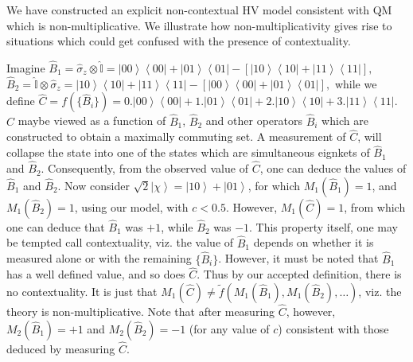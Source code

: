 \documentclass[british,aps,prl,superscriptaddress,nofootinbib,times,reprint]{revtex4-1}
\theoremstyle{plain}
\theoremstyle{plain}
\theoremstyle{definition}
\theoremstyle{remark}
\theoremstyle{remark}
\theoremstyle{remark}
\theoremstyle{plain}
\theoremstyle{plain}
\theoremstyle{plain}
\theoremstyle{definition}
\theoremstyle{definition}
\begin{document}
We have  constructed an explicit non-contextual HV
model consistent with QM which is
non-multiplicative. We illustrate how
non-multiplicativity gives rise to situations which
could get confused with the presence of contextuality.

Imagine
$
\hat{B}_{1}=\hat{\sigma}_{z}\otimes\hat{\mathbb{I}}=
\left|00\right\rangle
\left\langle 00\right|+\left|01\right\rangle
\left\langle 01\right|-\left[\left|10\right\rangle
\left\langle 10\right|+\left|11\right\rangle
\left\langle 11\right|\right],
$ 
$
\hat{B}_{2}=\hat{\mathbb{I}}\otimes\hat{\sigma}_{z}=
\left|10\right\rangle
\left\langle 10\right|+\left|11\right\rangle
\left\langle 11\right|-\left[\left|00\right\rangle
\left\langle 00\right|+\left|01\right\rangle
\left\langle 01\right|\right],
$ 
while we define 
$
\hat{C}=f(\{\hat{B}_{i}\})
=0.\left|00\right\rangle \left\langle
00\right|+1.\left|01\right\rangle \left\langle
01\right|+2.\left|10\right\rangle \left\langle
10\right|+3.\left|11\right\rangle \left\langle
11\right|. 
$
$\hat{C}$ maybe viewed as a function of
$\hat{B}_{1}$, $\hat{B}_{2}$ and other operators
$\hat{B}_{i}$ which are constructed to obtain a
maximally commuting set. A measurement of
$\hat{C}$, will collapse the state into one of the
states which are simultaneous eignkets of $\hat{B}_{1}$
and $\hat{B}_{2}$. Consequently, from the observed value
of $\hat{C}$, one can deduce the values of
$\hat{B}_{1}$ and $\hat{B}_{2}$. Now consider
$\sqrt{2}\left|\chi\right\rangle
=\left|10\right\rangle +\left|01\right\rangle $,
for which $M_{1}(\hat{B}_{1})=1$, and
$M_{1}(\hat{B}_{2})=1$, using our model,
with $c<0.5$. However, $M_{1}(\hat{C})=1$, from
which one can deduce that $\hat{B}_{1}$ was $+1$, while
$\hat{B}_{2}$ was $-1$.  This property itself, one may
be tempted call contextuality, viz.  the value of
$\hat{B}_{1}$ depends on whether it is measured alone or
with the remaining $\{\hat{B}_{i}\}$. However, it must
be noted that $\hat{B}_{1}$ has a well defined value,
and so does $\hat{C}$. Thus by our accepted
definition, there is no contextuality. It is just
that $M_{1}(\hat{C})\neq \tilde
f(M_{1}(\hat{B}_{1}),M_{1}(\hat{B}_{2}),\dots)$,
viz. the theory is non-multiplicative. Note that
after measuring $\hat{C}$, however,
$M_{2}(\hat{B}_{1})=+1$ and
$M_{2}(\hat{B}_{2})=-1$ (for any value of $c$)
consistent with those deduced by measuring
$\hat{C}$.
\end{document}
